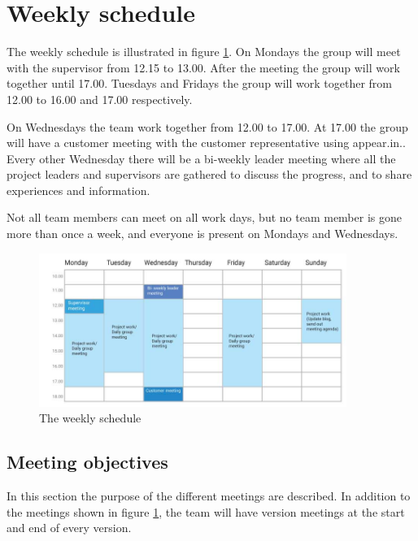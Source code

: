 \section{Weekly schedule}
The weekly schedule is illustrated in figure \ref{fig:weekly-schedule}.
On Mondays the group will meet with the supervisor from 12.15 to 13.00. After the meeting the group will work together until 17.00. Tuesdays and Fridays the group will work together from 12.00 to 16.00 and 17.00 respectively.

On Wednesdays the team work together from 12.00 to 17.00. At 17.00 the group will have a customer meeting with the customer representative using appear.in.\cite{appear-in}. Every other Wednesday there will be a bi-weekly leader meeting where all the project leaders and supervisors are gathered to discuss the progress, and to share experiences and information.

Not all team members can meet on all work days, but no team member is gone more than once a week, and everyone is present on Mondays and Wednesdays.

\begin{figure}
\centering
\includegraphics[height=5cm]{figs/WeeklySchedule.jpg}
\caption{The weekly schedule}
\label{fig:weekly-schedule}
\end{figure}

\subsection{Meeting objectives}
In this section the purpose of the different meetings are described. In addition to the meetings shown in figure \ref{fig:weekly-schedule}, the team will have version meetings at the start and end of every version. 


